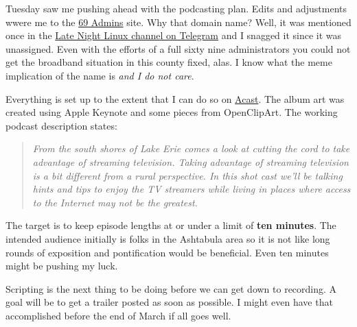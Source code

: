 Tuesday saw me pushing ahead with the podcasting plan. Edits and
adjustments wwere me to the \href{https://69admins.com}{69 Admins} site.
Why that domain name? Well, it was mentioned once in the
\href{https://latenightlinux.com/chatter}{Late Night Linux channel on
Telegram} and I snagged it since it was unassigned. Even with the
efforts of a full sixty nine administrators you could not get the
broadband situation in this county fixed, alas. I know what the meme
implication of the name is \emph{and I do not care}.

Everything is set up to the extent that I can do so on
\href{https://acast.com/}{Acast}. The album art was created using Apple
Keynote and some pieces from OpenClipArt. The working podcast
description states:

\begin{quote}
\emph{From the south shores of Lake Erie comes a look at cutting the
cord to take advantage of streaming television. Taking advantage of
streaming television is a bit different from a rural perspective. In
this shot cast we'll be talking hints and tips to enjoy the TV streamers
while living in places where access to the Internet may not be the
greatest.}
\end{quote}

The target is to keep episode lengths at or under a limit of \textbf{ten
minutes}. The intended audience initially is folks in the Ashtabula area
so it is not like long rounds of exposition and pontification would be
beneficial. Even ten minutes might be pushing my luck.

Scripting is the next thing to be doing before we can get down to
recording. A goal will be to get a trailer posted as soon as possible. I
might even have that accomplished before the end of March if all goes
well.
